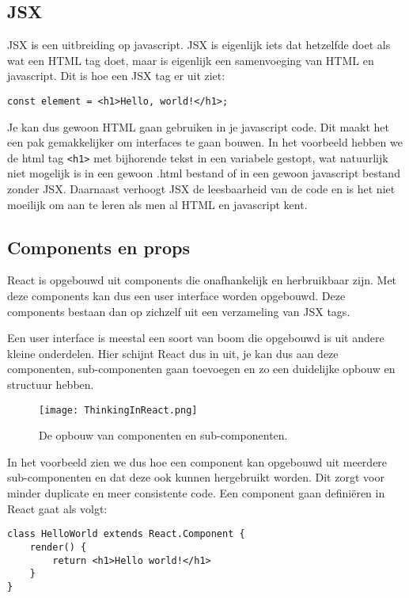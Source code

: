 \subsection{JSX}
\label{subsec:jsx}
JSX is een uitbreiding op javascript. JSX is eigenlijk iets dat hetzelfde doet als wat een HTML tag doet, maar is eigenlijk een samenvoeging van HTML en javascript. Dit is hoe een JSX tag er uit ziet: 

\begin{lstlisting}[frame=single, caption=Voorbeeld van een JSX tag]
const element = <h1>Hello, world!</h1>;
\end{lstlisting}

Je kan dus gewoon HTML gaan gebruiken in je javascript code. Dit maakt het een pak gemakkelijker om interfaces te gaan bouwen. In het voorbeeld hebben we de html tag \lstinline[basicstyle=\ttfamily\color{red}]|<h1>| met bijhorende tekst in een variabele gestopt, wat natuurlijk niet mogelijk is in een gewoon .html bestand of in een gewoon javascript bestand zonder JSX. Daarnaast verhoogt JSX de leesbaarheid van de code en is het niet moeilijk om aan te leren als men al HTML en javascript kent.

\subsection{Components en props}
\label{subsec:components-en-props}
React is opgebouwd uit components die onafhankelijk en herbruikbaar zijn. Met deze components kan dus een user interface worden opgebouwd. Deze components bestaan dan op zichzelf uit een verzameling van JSX tags.

Een user interface is meestal een soort van boom die opgebouwd is uit andere kleine onderdelen. Hier schijnt React dus in uit, je kan dus aan deze componenten, sub-componenten gaan toevoegen en zo een duidelijke opbouw en structuur hebben.

\begin{figure}
	\centering
	\texttt{[image: ThinkingInReact.png]}
	\caption{De opbouw van componenten en sub-componenten.}
	\label{fig:ar-vs-vr}
\end{figure}

In het voorbeeld zien we dus hoe een component kan opgebouwd uit meerdere sub-componenten en dat deze ook kunnen hergebruikt worden. Dit zorgt voor minder duplicate en meer consistente code. Een component gaan definiëren in React gaat als volgt:

\begin{lstlisting}[frame=single, caption=Het component HelloWorld wordt gedefinieerd]
class HelloWorld extends React.Component {
	render() {
		return <h1>Hello world!</h1>
	}
}
\end{lstlisting}


